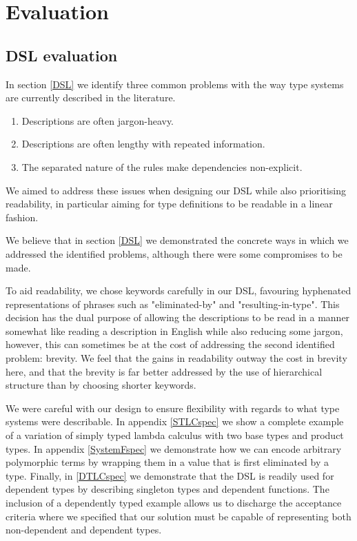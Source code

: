 \chapter{Evaluation}
\section{DSL evaluation}
\label{chapter-DSL-eval}
In section \ref{DSL} we identify three common problems with the way type
systems are currently described in the literature.

\begin{enumerate}
\item Descriptions are often jargon-heavy.
\item Descriptions are often lengthy with repeated information.
\item The separated nature of the rules make dependencies non-explicit.
\end{enumerate}

We aimed to address these issues when designing our DSL while also
prioritising readability, in particular aiming for type definitions
to be readable in a linear fashion.

We believe that in section \ref{DSL} we demonstrated the concrete
ways in which we addressed the identified problems, although there
were some compromises to be made.

To aid readability, we chose keywords carefully in our
DSL, favouring hyphenated representations of phrases such as
"eliminated-by" and "resulting-in-type". This decision has the dual
purpose of allowing the descriptions to be read in a manner somewhat
like reading a description in English while also reducing some jargon,
however, this can sometimes be at the cost of addressing the second
identified problem: brevity. We feel that the gains in
readability outway the cost in brevity here, and that the brevity is
far better addressed by the use of hierarchical structure than by
choosing shorter keywords. 

We were careful with our design to ensure flexibility with regards to
what type systems were describable. In appendix \ref{STLCspec} we show
a complete example of a variation of simply typed lambda calculus with
two base types and product types. In appendix \ref{SystemFspec} we
demonstrate how we can encode arbitrary polymorphic terms by wrapping
them in a value that is first eliminated by a type. Finally, in
\ref{DTLCspec} we demonstrate that the DSL is readily used for
dependent types by describing singleton types and dependent
functions. The inclusion of a dependently typed example allows us to
discharge the acceptance criteria where we specified that our solution
must be capable of representing both non-dependent and dependent types.

